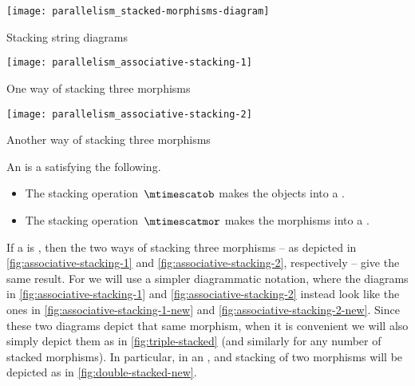 \begin{marginfigure}
    \centering
    \texttt{[image: parallelism\_stacked-morphisms-diagram]}
    \caption{Stacking string diagrams}
    \label{fig:stacked-morphisms-diagram}
\end{marginfigure}

\begin{marginfigure}[]
    \centering
    \texttt{[image: parallelism\_associative-stacking-1]}
    \caption{One way of stacking three morphisms}
    \label{fig:associative-stacking-1}
\end{marginfigure}

\begin{marginfigure}
    \centering
    \texttt{[image: parallelism\_associative-stacking-2]}
    \caption{Another way of stacking three morphisms}
    \label{fig:associative-stacking-2}
\end{marginfigure}

\begin{ctdefinition}
    \label{def:stacking-semi-cat}
    An   is a  satisfying the following.

    \condit
    \begin{itemize}
        \item The stacking operation~$\mtimescatob$ makes the objects into a .
        \item The stacking operation~$\mtimescatmor$ makes the morphisms into a .
    \end{itemize}
\end{ctdefinition}

If a  is  , then the two ways of stacking three morphisms -- as depicted in \cref{fig:associative-stacking-1} and \cref{fig:associative-stacking-2}, respectively -- give the same result.
For    we will use a simpler diagrammatic notation, where the diagrams in \cref{fig:associative-stacking-1} and \cref{fig:associative-stacking-2} instead look like the ones in \cref{fig:associative-stacking-1-new} and \cref{fig:associative-stacking-2-new}.
Since these two diagrams depict that same morphism, when it is convenient we will also simply depict them as in \cref{fig:triple-stacked} (and similarly for any number of stacked morphisms).
In particular, in an   , and stacking of two morphisms will be depicted as in \cref{fig:double-stacked-new}.

